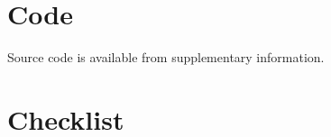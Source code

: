 \documentclass{article}
\begin{document}
\section{Code}
Source code is available from supplementary information.



\pagebreak
{\small



}

%

\pagebreak
\section*{Checklist}
\end{document}
